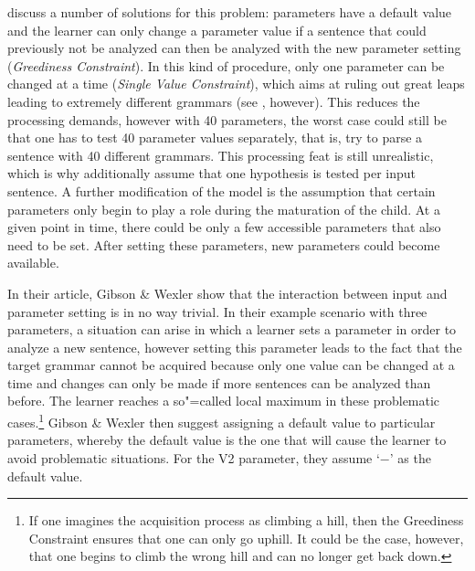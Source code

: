 \largerpage[2]
\citet{GW94a} discuss a number of solutions for this problem: parameters have a default value
and the learner can only change a parameter value if a sentence that could previously not be analyzed
can then be analyzed with the new parameter setting (\emph{Greediness Constraint}).
In this kind of procedure, only one parameter can be changed at a time
(\emph{Single Value Constraint}),
which aims at ruling out great leaps leading to extremely different grammars (see \citealp[--613]{BN96a}, however).
This reduces the processing demands, however with 40 parameters, the worst case could still be that
one has to test 40 parameter values separately, that is, try to parse a sentence with 40 different
grammars. This processing feat is still unrealistic, which is why \mbox{\citet[]{GW94a}} additionally
assume that one hypothesis is tested per input sentence.
A further modification of the model is the assumption that certain parameters only begin to play a role
during the maturation of the child. At a given point in time, there could be only a few accessible parameters
that also need to be set. After setting these parameters, new parameters could become available.

In their article, Gibson \& Wexler show that the interaction between input and parameter setting is in no way trivial.
In their example scenario with three parameters, a situation can arise in which a learner sets a parameter in order to analyze
a new sentence, however setting this parameter leads to the fact that the target grammar cannot be acquired because only one value can
be changed at a time and changes can only be made if more sentences can be analyzed than before. The learner reaches a so"=called
local maximum in these problematic cases.\footnote{%
	If one imagines the acquisition process as climbing a hill, then the Greediness Constraint ensures
	that one can only go uphill. It could be the case, however, that one begins to climb the wrong hill and can no longer get back down.}
Gibson \& Wexler then suggest assigning a default value to particular parameters, whereby the default value is the one that will cause the learner
to avoid problematic situations. For the V2 parameter, they assume `$-$' as the default value.

